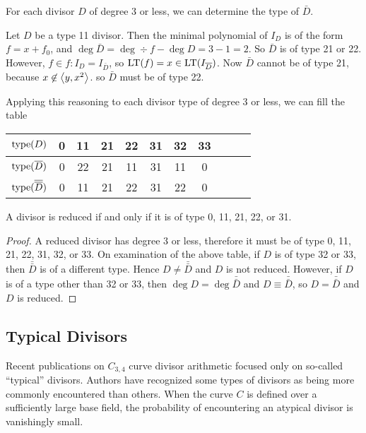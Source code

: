 For each divisor $D$ of degree 3 or less, we can determine the type of $\bar D$.
\begin{example}
  Let $D$ be a type 11 divisor.
  Then the minimal polynomial of $I_D$ is of the form $f = x + f_0$,
  and $\deg \bar D = \deg \div f - \deg D = 3 - 1 = 2$.
  So $\bar D$ is of type 21 or 22.
  However, $f \in f : I_D = I_{\bar D}$,
  so $\operatorname{LT}(f) = x \in \operatorname{LT}(I_{\overline D})$.
  Now $\bar D$ cannot be of type 21, because $x \not\in \left\langle y, x^2 \right\rangle$.
  so $\bar D$ must be of type 22.
\end{example}

Applying this reasoning to each divisor type of degree 3 or less,
we can fill the table
\begin{center}
  \begin{tabular}{r|cccccccccc}
    $\operatorname{type}(D)$             & 0 & 11 & 21 & 22 & 31 & 32 & 33 \\
    \hline
    $\operatorname{type}(\overline D)$        & 0 & 22 & 21 & 11 & 31 & 11 & 0 \\
    $\operatorname{type}(\overline {\overline D})$ & 0 & 11 & 21 & 22 & 31 & 22 & 0
  \end{tabular}
\end{center}

\begin{theorem}
  A divisor is reduced if and only if it is of type 0, 11, 21, 22, or 31.
\end{theorem}
\begin{proof}
  A reduced divisor has degree 3 or less, therefore it must be of type 0, 11, 21, 22, 31, 32, or 33.
  On examination of the above table, if $D$ is of type 32 or 33, then $\bar{\bar D}$ is of a different type.
  Hence $D \neq \bar{\bar D}$ and $D$ is not reduced.
  However, if $D$ is of a type other than 32 or 33,
  then $\deg D = \deg \bar{\bar D}$ and $D \equiv \bar{\bar D}$,
  so $D = \bar{\bar D}$ and $D$ is reduced.
\end{proof}



\subsection{Typical Divisors}

Recent publications on $C_{3,4}$ curve divisor arithmetic focused only on so-called ``typical'' divisors.
Authors have recognized some types of divisors as being more commonly encountered than others.
When the curve $C$ is defined over a sufficiently large base field,
the probability of encountering an atypical divisor is vanishingly small.


